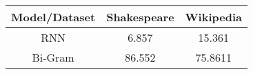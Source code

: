 \begin{center}
\begin{tabular}{||c c c||} 
    \hline
    Model/Dataset & Shakespeare & Wikipedia \\ [0.5ex] 
    \hline\hline
    RNN & 6.857 & 15.361 \\ 
    \hline
    Bi-Gram & 86.552 & 75.8611 \\
    \hline
\end{tabular}
\end{center}